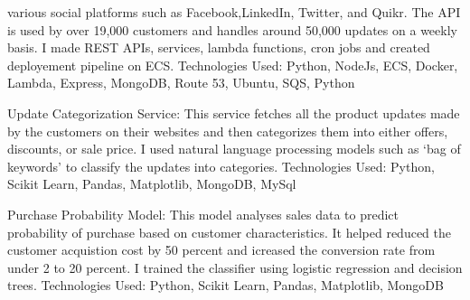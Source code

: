 \begin{cventries}
{\begin{cvitems}
{        various social platforms such as Facebook,LinkedIn, Twitter, and Quikr. The API is used 
        by over 19,000 customers and handles around 50,000 updates on a weekly basis. 
        I made REST APIs, services, lambda functions, cron jobs and created deployement pipeline on 
        ECS. 
        Technologies Used: Python, NodeJs, ECS, Docker, Lambda, Express, MongoDB, Route 53, Ubuntu, SQS, Python}
        \item {Update Categorization Service: This service fetches all the product updates made by the 
        customers on their websites and then categorizes them into either offers, discounts, or sale price. 
        I used natural language processing models such as ‘bag of keywords’ to classify the updates 
        into categories. Technologies Used: Python, Scikit Learn, Pandas, Matplotlib, MongoDB, MySql }
        \item {Purchase Probability Model: This model analyses sales data to predict probability 
        of purchase based on customer characteristics. It helped reduced the customer acquistion cost by 
        50 percent and icreased the conversion rate from under 2 to 20 percent. I trained the classifier using 
        logistic regression and decision trees. 
        Technologies Used: Python, Scikit Learn, Pandas, Matplotlib, MongoDB}
      \end{cvitems}
    }

\end{cventries}